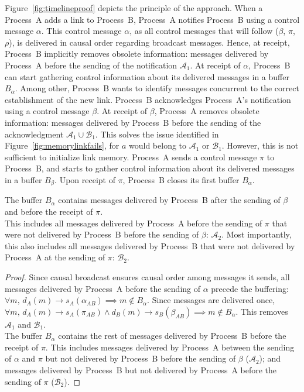 Figure~\ref{fig:timelineproof} depicts the principle of the approach. When a
Process~A adds a link to Process~B, Process~A notifies Process~B using a control
message $\alpha$. This control message $\alpha$, as all control messages that
will follow ($\beta$, $\pi$, $\rho$), is delivered in causal order regarding
broadcast messages. Hence, at receipt, Process~B implicitly removes obsolete
information: messages delivered by Process~A before the sending of the
notification $\mathcal{A}_1$.  At receipt of $\alpha$, Process~B can start
gathering control information about its delivered messages in a buffer
$B_\alpha$. Among other, Process~B wants to identify messages concurrent to the
correct establishment of the new link. Process~B acknowledges Process~A's
notification using a control message $\beta$. At receipt of $\beta$, Process~A
removes obsolete information: messages delivered by Process~B before the sending
of the acknowledgment $\mathcal{A}_1 \cup \mathcal{B}_1$. This solves the issue
identified in Figure~\ref{fig:memorylinkfails}, for $a$ would belong to
$\mathcal{A}_1$ or $\mathcal{B}_1$. However, this is not sufficient to
initialize link memory.  Process~A sends a control message $\pi$ to Process~B,
and starts to gather control information about its delivered messages in a
buffer $B_\beta$. Upon receipt of $\pi$, Process~B closes its first buffer
$B_\alpha$.
  
\begin{lemma}
  The buffer $B_\alpha$ contains messages delivered by Process~B after the
  sending of $\beta$ and before the receipt of $\pi$.\\
  This includes all messages delivered by Process~A before the sending of $\pi$
  that were not delivered by Process~B before the sending of $\beta$:
  $\mathcal{A}_2$. Most importantly, this also includes all messages delivered
  by Process~B that were not delivered by Process~A at the sending of $\pi$:
  $\mathcal{B}_2$.
\end{lemma}

\begin{proof}
  Since causal broadcast ensures causal order among messages it sends, all
  messages delivered by Process~A before the sending of $\alpha$ precede the
  buffering:
  $\forall m,\, d_A(m) \rightarrow s_A(\alpha_{AB}) \implies m \not \in
  B_\alpha$.
  Since messages are delivered once,
  $\forall m,\, d_A(m) \rightarrow s_A(\pi_{AB}) \wedge d_B(m) \rightarrow
  s_B(\beta_{AB}) \implies m \not \in B_\alpha$.
  This removes $\mathcal{A}_1$ and $\mathcal{B}_1$.\\
  The buffer $B_\alpha$ contains the rest of messages delivered by Process~B
  before the receipt of $\pi$. This includes messages delivered by Process~A
  between the sending of $\alpha$ and $\pi$ but not delivered by Process~B
  before the sending of $\beta$ ($\mathcal{A}_2$); and messages delivered by
  Process~B but not delivered by Process~A before the sending of $\pi$
  ($\mathcal{B}_2$).
\end{proof}

